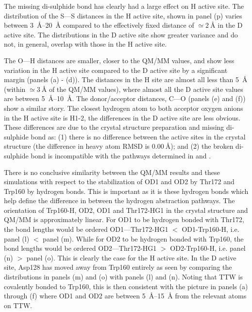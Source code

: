 The missing di-sulphide bond has clearly had a large effect on H active site.  The distribution of the S---S distances in the H active site, shown in panel (p) varies between  \SIrange{3}{20}{\angstrom} compared to the effectively fixed distance of $\simeq \SI{2}{\angstrom}$ in the D active site. The distributions in the D active site show greater variance and do not, in general, overlap with those in the H active site.

The O---H distances are smaller, closer to the QM/MM values, and show less variation in the H active site compared to the D active site by a significant margin (panels (a) - (d)). The distances in the H site are almost all less than \SI{5}{\angstrom} (within $\simeq\SI{3}{\angstrom}$ of the QM/MM values), where almost all the D active site values are between \SIrange{5}{10}{\angstrom}. The donor/acceptor distances, C---O (panels (e) and (f)) show a similar story. The closest hydrogen atom to both acceptor oxygen anions in the H active site is H1-2, the differences in the D active site are less obvious. These differences are due to the crystal structure preparation and missing di-sulphide bond as: (1) there is no difference between the active sites in the crystal structure (the difference in heavy atom RMSD is $\SI{0.00}{\angstrom}$); and (2) the broken di-sulphide bond is incompatible with the pathways determined in \cite{masgrauTunnelingClassicalPaths2007}
and \cite{ranaghanInitioQMMM2017}. 

There is no conclusive similarity between the QM/MM results and these simulations with respect to the stabilization of OD1 and OD2 by Thr172 and Trp160 by hydrogen bonds. This is important as it is these hydrogen bonds which help define the difference in between the hydrogen abstraction pathways. The orientation of Trp160-H, OD2, OD1 and Thr172-HG1 in the crystal structure and QM/MM is approximately linear. For OD1 to be hydrogen bonded with Thr172, the bond lengths would be ordered OD1---Thr172-HG1 $<$ OD1-Trp160-H, i.e. panel (l) $<$ panel (m). While for OD2 to be hydrogen bonded with Trp160, the bond lengths would be ordered OD2---Thr172-HG1 $>$ OD2-Trp160-H, i.e. panel (n) $>$ panel (o). This is clearly the case for the H active site. In the D active site, Asp128 has moved away from Trp160 entirely as seen by comparing the distributions in  panels (m) and (o)  with panels (l) and (n). Noting that TTW is covalently bonded to Trp160, this is then consistent with the picture in panels (a) through (f) where OD1 and OD2 are between \SIrange{5}{15}{\angstrom} from the relevant atoms on TTW.  

